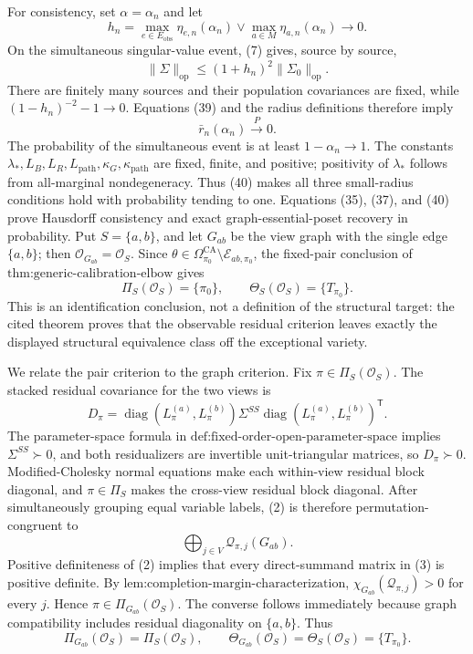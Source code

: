 For consistency, set \(\alpha=\alpha_n\) and let
\[
h_n=\max_{e\in E_{\mathrm{obs}}}\eta_{e,n}(\alpha_n)
\vee\max_{a\in M}\eta_{a,n}(\alpha_n)\longrightarrow0.
\tag{38}
\]
On the simultaneous singular-value event, (7) gives, source by source,
\[
\|\widehat\Sigma\|_{\mathrm{op}}
\le(1+h_n)^2\|\Sigma_0\|_{\mathrm{op}}.
\tag{39}
\]
There are finitely many sources and their population covariances are fixed, while \((1-h_n)^{-2}-1\to0\).  Equations (39) and the radius definitions therefore imply
\[
\bar r_n(\alpha_n)\xrightarrow{P}0.
\tag{40}
\]
The probability of the simultaneous event is at least \(1-\alpha_n\to1\).  The constants \(\lambda_*,L_B,L_R,L_{\mathrm{path}},\kappa_G,\kappa_{\mathrm{path}}\) are fixed, finite, and positive; positivity of \(\lambda_*\) follows from all-marginal nondegeneracy.  Thus (40) makes all three small-radius conditions hold with probability tending to one.  Equations (35), (37), and (40) prove Hausdorff consistency and exact graph-essential-poset recovery in probability.
Put \(S=\{a,b\}\), and let \(G_{ab}\) be the view graph with the single edge \(\{a,b\}\); then \(\mathcal O_{G_{ab}}=\mathcal O_S\).  Since \(\theta\in\Omega_{\pi_0}^{\mathrm{CA}}\setminus\mathcal E_{ab,\pi_0}\), the fixed-pair conclusion of \(\text{thm:generic-calibration-elbow}\) gives
\[
\Pi_S(\mathcal O_S)=\{\pi_0\},
\qquad
\Theta_S(\mathcal O_S)=\{T_{\pi_0}\}.
\tag{1}
\]
This is an identification conclusion, not a definition of the structural target: the cited theorem proves that the observable residual criterion leaves exactly the displayed structural equivalence class off the exceptional variety.

We relate the pair criterion to the graph criterion.  Fix \(\pi\in\Pi_S(\mathcal O_S)\).  The stacked residual covariance for the two views is
\[
D_\pi=
\operatorname{diag}(L_\pi^{(a)},L_\pi^{(b)})
\Sigma^{SS}
\operatorname{diag}(L_\pi^{(a)},L_\pi^{(b)})^{\mathsf T}.
\tag{2}
\]
The parameter-space formula in \(\text{def:fixed-order-open-parameter-space}\) implies \(\Sigma^{SS}\succ0\), and both residualizers are invertible unit-triangular matrices, so \(D_\pi\succ0\).  Modified-Cholesky normal equations make each within-view residual block diagonal, and \(\pi\in\Pi_S\) makes the cross-view residual block diagonal.  After simultaneously grouping equal variable labels, (2) is therefore permutation-congruent to
\[
\bigoplus_{j\in V}\mathcal Q_{\pi,j}(G_{ab}).
\tag{3}
\]
Positive definiteness of (2) implies that every direct-summand matrix in (3) is positive definite.  By \(\text{lem:completion-margin-characterization}\), \(\chi_{G_{ab}}(\mathcal Q_{\pi,j})>0\) for every \(j\).  Hence \(\pi\in\Pi_{G_{ab}}(\mathcal O_S)\).  The converse follows immediately because graph compatibility includes residual diagonality on \(\{a,b\}\).  Thus
\[
\Pi_{G_{ab}}(\mathcal O_S)=\Pi_S(\mathcal O_S),
\qquad
\Theta_{G_{ab}}(\mathcal O_S)=\Theta_S(\mathcal O_S)=\{T_{\pi_0}\}.
\tag{4}
\]

